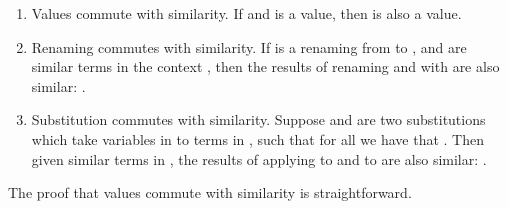 \begin{enumerate}
\item
  Values commute with similarity. If  and  is a
  value, then  is also a value.

\item
  Renaming commutes with similarity. If  is a renaming from
   to , and  are similar terms in the context
  , then the results of renaming  and  with 
  are also similar: .

\item
  Substitution commutes with similarity. Suppose  and  are two
  substitutions which take variables  in  to terms in ,
  such that for all  we have that . Then given similar terms  in , the results
  of applying  to  and  to  are also
  similar: .
\end{enumerate}

The proof that values commute with similarity is straightforward.

\begin{code}%
\>[0]\AgdaSpace{}%
\AgdaSymbol{:}\AgdaSpace{}%
\AgdaSpace{}%
\AgdaSymbol{\{}\AgdaSpace{}%
\AgdaSymbol{\}}\AgdaSpace{}%
\AgdaSymbol{\{}\AgdaSpace{}%
\AgdaSymbol{:}\AgdaSpace{}%
\AgdaSpace{}%
\AgdaSpace{}%
\AgdaSymbol{\}}\AgdaSpace{}%
\AgdaSymbol{\{}\AgdaSpace{}%
\AgdaSymbol{:}\AgdaSpace{}%
\AgdaSpace{}%
\AgdaSpace{}%
\AgdaSymbol{\}}\<%
\\
\>[0][@{}l@{\AgdaIndent{0}}]%
\>[2]\AgdaSpace{}%
\AgdaSpace{}%
\AgdaOperator{\AgdaDatatype{\textasciitilde{}}}\AgdaSpace{}%
\<%
\\
%
\>[2]%
\>[296I]\AgdaSpace{}%
\<%
\\
\>[.]\<[296I]%
\>[4]\AgdaComment{{-}{-}{-}{-}{-}{-}{-}{-}{-}}\<%
\\
%
\>[2]\AgdaSpace{}%
\AgdaSpace{}%
\<%
\\
\>[0]\AgdaSpace{}%
%
\>[16]\AgdaSymbol{()}\<%
\\
\>[0]\AgdaSpace{}%
\AgdaSymbol{(}\AgdaSpace{}%
\AgdaSymbol{)}%
\>[16]%
\>[23]\AgdaSymbol{=}%
\>[26]\<%
\\
\>[0]\AgdaSpace{}%
\AgdaSymbol{(}\AgdaSpace{}%
\AgdaSpace{}%
\AgdaSymbol{)}\AgdaSpace{}%
\AgdaSymbol{()}\<%
\end{code}

